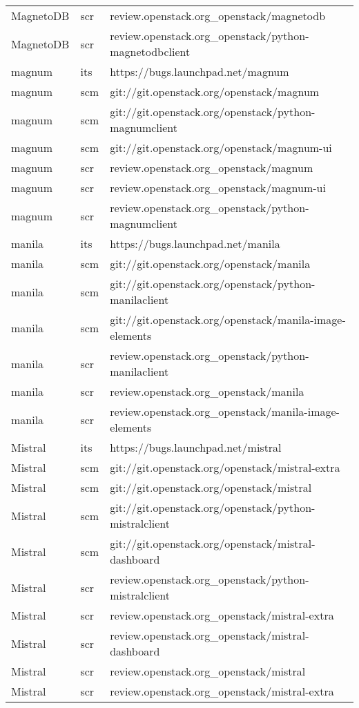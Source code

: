 \begin{center}
\begin{longtable}{|p{4cm}|p{1cm}|p{10cm}|}
MagnetoDB&scr&review.openstack.org\_openstack/magnetodb\\ 
MagnetoDB&scr&review.openstack.org\_openstack/python-magnetodbclient\\ 
magnum&its&https://bugs.launchpad.net/magnum\\ 
magnum&scm&git://git.openstack.org/openstack/magnum\\ 
magnum&scm&git://git.openstack.org/openstack/python-magnumclient\\ 
magnum&scm&git://git.openstack.org/openstack/magnum-ui\\ 
magnum&scr&review.openstack.org\_openstack/magnum\\ 
magnum&scr&review.openstack.org\_openstack/magnum-ui\\ 
magnum&scr&review.openstack.org\_openstack/python-magnumclient\\ 
manila&its&https://bugs.launchpad.net/manila\\ 
manila&scm&git://git.openstack.org/openstack/manila\\ 
manila&scm&git://git.openstack.org/openstack/python-manilaclient\\ 
manila&scm&git://git.openstack.org/openstack/manila-image-elements\\ 
manila&scr&review.openstack.org\_openstack/python-manilaclient\\ 
manila&scr&review.openstack.org\_openstack/manila\\ 
manila&scr&review.openstack.org\_openstack/manila-image-elements\\ 
Mistral&its&https://bugs.launchpad.net/mistral\\ 
Mistral&scm&git://git.openstack.org/openstack/mistral-extra\\ 
Mistral&scm&git://git.openstack.org/openstack/mistral\\ 
Mistral&scm&git://git.openstack.org/openstack/python-mistralclient\\ 
Mistral&scm&git://git.openstack.org/openstack/mistral-dashboard\\ 
Mistral&scr&review.openstack.org\_openstack/python-mistralclient\\ 
Mistral&scr&review.openstack.org\_openstack/mistral-extra\\ 
Mistral&scr&review.openstack.org\_openstack/mistral-dashboard\\ 
Mistral&scr&review.openstack.org\_openstack/mistral\\ 
Mistral&scr&review.openstack.org\_openstack/mistral-extra\\ 

\end{longtable}
\end{center}
